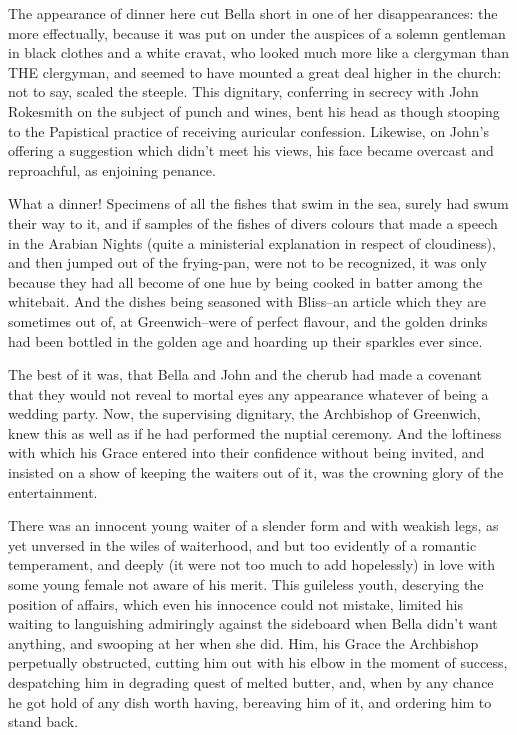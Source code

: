The appearance of dinner here cut Bella short in one of her
disappearances: the more effectually, because it was put on under the
auspices of a solemn gentleman in black clothes and a white cravat, who
looked much more like a clergyman than THE clergyman, and seemed to
have mounted a great deal higher in the church: not to say, scaled the
steeple. This dignitary, conferring in secrecy with John Rokesmith on
the subject of punch and wines, bent his head as though stooping to
the Papistical practice of receiving auricular confession. Likewise,
on John’s offering a suggestion which didn’t meet his views, his face
became overcast and reproachful, as enjoining penance.

What a dinner! Specimens of all the fishes that swim in the sea, surely
had swum their way to it, and if samples of the fishes of divers
colours that made a speech in the Arabian Nights (quite a ministerial
explanation in respect of cloudiness), and then jumped out of the
frying-pan, were not to be recognized, it was only because they had all
become of one hue by being cooked in batter among the whitebait. And the
dishes being seasoned with Bliss--an article which they are sometimes
out of, at Greenwich--were of perfect flavour, and the golden drinks
had been bottled in the golden age and hoarding up their sparkles ever
since.

The best of it was, that Bella and John and the cherub had made a
covenant that they would not reveal to mortal eyes any appearance
whatever of being a wedding party. Now, the supervising dignitary, the
Archbishop of Greenwich, knew this as well as if he had performed the
nuptial ceremony. And the loftiness with which his Grace entered into
their confidence without being invited, and insisted on a show
of keeping the waiters out of it, was the crowning glory of the
entertainment.

There was an innocent young waiter of a slender form and with weakish
legs, as yet unversed in the wiles of waiterhood, and but too evidently
of a romantic temperament, and deeply (it were not too much to add
hopelessly) in love with some young female not aware of his merit.
This guileless youth, descrying the position of affairs, which even
his innocence could not mistake, limited his waiting to languishing
admiringly against the sideboard when Bella didn’t want anything, and
swooping at her when she did. Him, his Grace the Archbishop perpetually
obstructed, cutting him out with his elbow in the moment of success,
despatching him in degrading quest of melted butter, and, when by any
chance he got hold of any dish worth having, bereaving him of it, and
ordering him to stand back.

